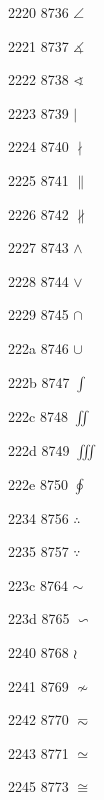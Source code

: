 \documentclass[11pt]{article}
\begin{document}
2220 8736 \ensuremath{\angle}

2221 8737 \ensuremath{\measuredangle}

2222 8738 \ensuremath{\sphericalangle}

2223 8739 \ensuremath{\mid}

2224 8740 \ensuremath{\nmid}

2225 8741 \ensuremath{\parallel}

2226 8742 \ensuremath{\nparallel}

2227 8743 \ensuremath{\wedge}

2228 8744 \ensuremath{\vee}

2229 8745 \ensuremath{\cap}

222a 8746 \ensuremath{\cup}

222b 8747 \ensuremath{\int}

222c 8748 \ensuremath{\iint}

222d 8749 \ensuremath{\iiint}

222e 8750 \ensuremath{\oint}






2234 8756 \ensuremath{\therefore}

2235 8757 \ensuremath{\because}





223c 8764 \ensuremath{\sim}

223d 8765 \ensuremath{\backsim}


2240 8768 \ensuremath{\wr}

2241 8769 \ensuremath{\nsim}

2242 8770 \ensuremath{\eqsim}

2243 8771 \ensuremath{\simeq}


2245 8773 \ensuremath{\cong}

\end{document}
